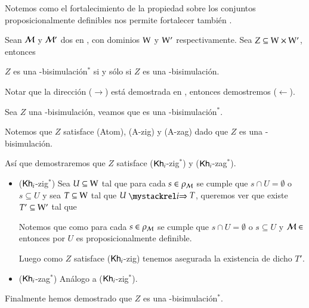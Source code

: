 Notemos como el fortalecimiento de la propiedad sobre los conjuntos proposicionalmente definibles nos permite fortalecer también .

\begin{lema}\label{lema:old-implies-new-finite}
    Sean $\mathcal{M}$ y $\mathcal{M}'$ dos \ultss en \MFD, con dominios $\mathrm{W}$ y $\mathrm{W}'$ respectivamente. Sea $Z \subseteq \mathrm{W} \times \mathrm{W}'$, entonces 
    \begin{center}
        $Z$ es una \KHilogic-bisimulación$^*$ si y sólo si $Z$ es una \KHilogic-bisimulación.
    \end{center}
\end{lema}

\begin{demostracion}
    Notar que la dirección ($\rightarrow$) está demostrada en , entonces demostremos ($\leftarrow$).
    
    Sea $Z$ una \KHilogic-bisimulación, veamos que es una \KHilogic-bisimulación$^*$.

    Notemos que $Z$ satisface (Atom), (A-zig) y (A-zag) dado que $Z$ es una \KHilogic-bisimulación.

    Así que demostraremos que $Z$ satisface ($\mathsf{Kh}_i$-zig$^*$) y ($\mathsf{Kh}_i$-zag$^*$).

    \begin{itemize}
        \item ($\mathsf{Kh}_i$-zig$^*$) Sea $U \subseteq \mathrm{W}$ tal que para cada $s \in \rho_{\mathcal{M}}$ se cumple que $s \cap U = \emptyset$ o $s \subseteq U$ 
        y sea $T \subseteq \mathrm{W}$ tal que $U \ultsExecAgi T$, queremos ver que existe $T' \subseteq \mathrm{W}'$ tal que

        \begin{multicols}{2}
        \end{multicols}

        Notemos que como para cada $s \in \rho_{\mathcal{M}}$ se cumple que $s \cap U = \emptyset$ o $s \subseteq U$ y $\mathcal{M} \in $ \MFD entonces 
        por  $U$ es proposicionalmente definible.
    
        Luego como $Z$ satisface ($\mathsf{Kh}_i$-zig) tenemos asegurada la existencia de dicho $T'$.
    
        \item ($\mathsf{Kh}_i$-zag$^*$) Análogo a ($\mathsf{Kh}_i$-zig$^*$). 
    \end{itemize}

    Finalmente hemos demostrado que $Z$ es una \KHilogic-bisimulación$^*$.
\end{demostracion}

